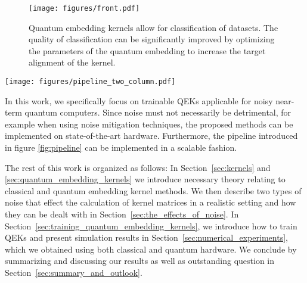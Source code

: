 \documentclass[twocolumn,superscriptaddress,nofootinbib]{revtex4-2}
\newcommand{\todo}[1]{\textcolor{red}{[TODO: #1]}}
\begin{document}
\begin{figure}
    \centering
    \texttt{[image: figures/front.pdf]}
    \caption{Quantum embedding kernels allow for classification of datasets. The quality of classification can be significantly improved by optimizing the parameters of the quantum embedding to increase the target alignment of the kernel.}
    \label{fig:target_alignment}
\end{figure}

\begin{figure*}
    \centering
    \texttt{[image: figures/pipeline\_two\_column.pdf]}
    \caption{Schematic of the pipeline used in this work. Green boxes indicate data, purple boxes indicate process steps that are executed on quantum hardware. The pipeline used in this work can be split in three separate parts. In the model selection part, depicted on the left, the parameters of the feature map are adjusted to increase the kernel-target alignment. To calculate the alignment, the kernel matrix is computed and afterwards post-processed to mitigate sampling and device errors. After a sufficient target-alignment is reached, the kernel is used to train a support vector machine. The resulting support vector classifier is used to in the prediction step to label new datapoints.}
    \label{fig:pipeline}
\end{figure*}

In this work, we specifically focus on trainable \acp{QEK} applicable for noisy near-term quantum computers. Since noise must not necessarily be detrimental, for example when using noise mitigation techniques, the proposed methods can be implemented on state-of-the-art hardware. Furthermore, the pipeline introduced in figure \ref{fig:pipeline} can be implemented in a scalable fashion.


The rest of this work is organized as follows:
In Section~\ref{sec:kernels} and \ref{sec:quantum_embedding_kernels} we introduce necessary theory relating to classical and quantum embedding kernel methods.
We then describe two types of noise that effect the calculation of kernel matrices in a realistic setting and how they can be dealt with in Section~\ref{sec:the_effects_of_noise}.
In Section~\ref{sec:training_quantum_embedding_kernels}, we introduce how to train \acp{QEK} and present simulation results in Section~\ref{sec:numerical_experiments}, which we obtained using both classical and quantum hardware. 
We conclude by summarizing and discussing our results as well as outstanding question in Section~\ref{sec:summary_and_outlook}.
\end{document}
